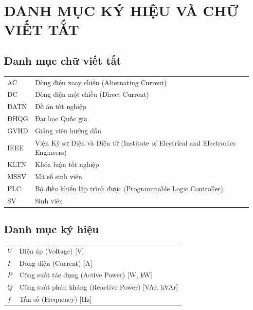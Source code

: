 
\chapter*{DANH MỤC KÝ HIỆU VÀ CHỮ VIẾT TẮT}


\section*{Danh mục chữ viết tắt}
\begin{longtable}{p{2.5cm} p{13cm}}
    AC    & Dòng điện xoay chiều (Alternating Current) \\
    DC    & Dòng điện một chiều (Direct Current) \\
    ĐATN  & Đồ án tốt nghiệp \\
    ĐHQG  & Đại học Quốc gia \\
    GVHD  & Giảng viên hướng dẫn \\
    IEEE  & Viện Kỹ sư Điện và Điện tử (Institute of Electrical and Electronics Engineers) \\
    KLTN  & Khóa luận tốt nghiệp \\
    MSSV  & Mã số sinh viên \\
    PLC   & Bộ điều khiển lập trình được (Programmable Logic Controller) \\
    SV    & Sinh viên \\
\end{longtable}

\section*{Danh mục ký hiệu}
\begin{longtable}{p{2.5cm} p{13cm}}
    $V$   & Điện áp (Voltage) [V] \\
    $I$   & Dòng điện (Current) [A] \\
    $P$   & Công suất tác dụng (Active Power) [W, kW] \\
    $Q$   & Công suất phản kháng (Reactive Power) [VAr, kVAr] \\
    $f$   & Tần số (Frequency) [Hz] \\
\end{longtable}
